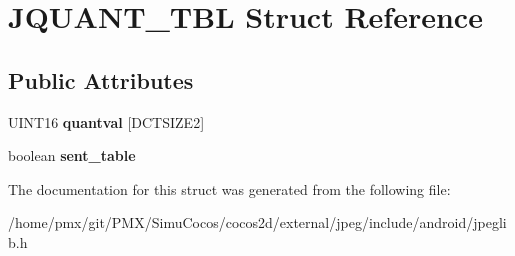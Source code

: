 \hypertarget{structJQUANT__TBL}{}\section{J\+Q\+U\+A\+N\+T\+\_\+\+T\+BL Struct Reference}
\label{structJQUANT__TBL}
\subsection*{Public Attributes}
\begin{DoxyCompactItemize}
\item 
\mbox{\label{structJQUANT__TBL_ab2775ab63a4311a8ed446c35fb3847dd}} 
U\+I\+N\+T16 {\bfseries quantval} \mbox{[}D\+C\+T\+S\+I\+Z\+E2\mbox{]}
\item 
\mbox{\label{structJQUANT__TBL_a218b782157eccfbd22023ae6bb4cc7fa}} 
boolean {\bfseries sent\+\_\+table}
\end{DoxyCompactItemize}


The documentation for this struct was generated from the following file\+:\begin{DoxyCompactItemize}
\item 
/home/pmx/git/\+P\+M\+X/\+Simu\+Cocos/cocos2d/external/jpeg/include/android/jpeglib.\+h\end{DoxyCompactItemize}
